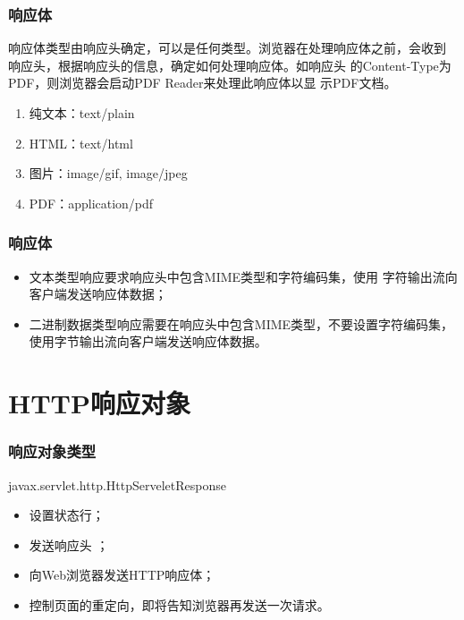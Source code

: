 \begin{frame}[fragile] %
\frametitle{ 响应体} 

响应体类型由响应头确定，可以是任何类型。浏览器在处理响应体之前，会收到
响应头，根据响应头的信息，确定如何处理响应体。{\kai\Red 如响应头
  的Content-Type为PDF，则浏览器会启动PDF Reader来处理此响应体以显
  示PDF文档。}


\begin{enumerate}
\item 纯文本：text/plain
\item HTML：text/html
\item 图片：image/gif, image/jpeg
\item PDF：application/pdf
\end{enumerate}

\end{frame}

\begin{frame}[fragile] %
\frametitle{ 响应体} 


\begin{itemize}
\item 文本类型响应要求响应头中包含MIME类型和字符编码集，使用{\hei\Red
    字符输出流}向客户端发送响应体数据；
\item 二进制数据类型响应需要在响应头中包含MIME类型，不要设置字符编码集，
  使用{\hei\Blue 字节输出流}向客户端发送响应体数据。
\end{itemize}
\end{frame}

\section{HTTP响应对象}

\begin{frame}[fragile] %
\frametitle{响应对象类型} 


javax.servlet.http.HttpServeletResponse


\begin{itemize}
\item 设置状态行；
\item 发送响应头 ；
\item 向Web浏览器发送HTTP响应体；
\item 控制页面的重定向，即将告知浏览器再发送一次请求。
\end{itemize}
\end{frame}

